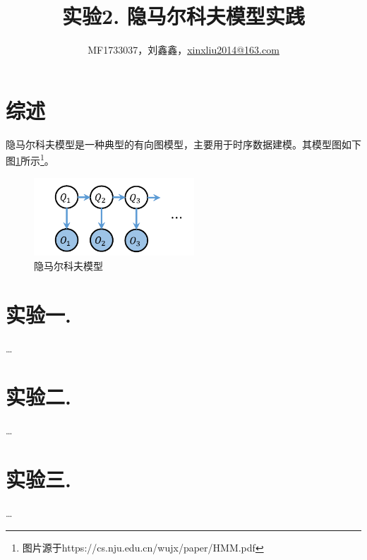 \documentclass[a4paper,UTF8]{article}
\theoremstyle{definition}
\begin{document}
\title{实验2. 隐马尔科夫模型实践}
\author{MF1733037，刘鑫鑫，\url{xinxliu2014@163.com}}
\maketitle

\section*{综述}
隐马尔科夫模型是一种典型的有向图模型，主要用于时序数据建模。其模型图如下图\ref{fig-1}所示\footnote{图片源于https://cs.nju.edu.cn/wujx/paper/HMM.pdf}。
\begin{figure}[htbp]
\centering
\includegraphics[width=6cm]{1.png}
\caption{隐马尔科夫模型}
\label{fig-1}
\end{figure}
\section*{实验一.}
	\dots

\section*{实验二.}
	\dots

\section*{实验三. }
	\dots
\end{document}
